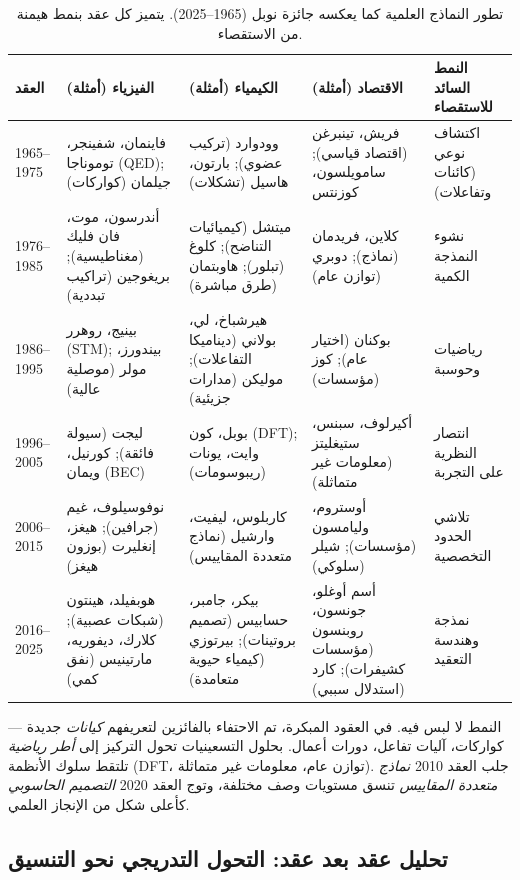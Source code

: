\documentclass[12pt,a4paper]{article}
\begin{document}
	\begin{table}[htbp]
		\centering
		\caption{تطور النماذج العلمية كما يعكسه جائزة نوبل (1965--2025). يتميز كل عقد بنمط هيمنة من الاستقصاء.}
		\label{tab:nobel}
		\small
		\begin{tabular}{p{2.5cm}p{3.5cm}p{3.5cm}p{2.5cm}p{2.8cm}}
			\toprule
			\textbf{العقد} & \textbf{الفيزياء (أمثلة)} & \textbf{الكيمياء (أمثلة)} & \textbf{الاقتصاد (أمثلة)} & \textbf{النمط السائد للاستقصاء} \\
			\midrule
			1965--1975 & فاينمان، شفينجر، توموناجا (QED); جيلمان (كواركات) & وودوارد (تركيب عضوي); بارتون، هاسيل (تشكلات) & فريش، تينبرغن (اقتصاد قياسي); سامويلسون، كوزنتس & اكتشاف نوعي (كائنات وتفاعلات) \\
			1976--1985 & أندرسون، موت، فان فليك (مغناطيسية); بريغوجين (تراكيب تبددية) & ميتشل (كيميائيات التناضح); كلوغ (تبلور); هاوبتمان (طرق مباشرة) & كلاين، فريدمان (نماذج); دوبري (توازن عام) & نشوء النمذجة الكمية \\
			1986--1995 & بينيج، روهرر (STM); بيندورز، مولر (موصلية عالية) & هيرشباخ، لي، بولاني (ديناميكا التفاعلات); موليكن (مدارات جزيئية) & بوكنان (اختيار عام); كوز (مؤسسات) & رياضيات وحوسبة \\
			1996--2005 & ليجت (سيولة فائقة); كورنيل، ويمان (BEC) & بوبل، كون (DFT); وايت، يونات (ريبوسومات) & أكيرلوف، سبنس، ستيغليتز (معلومات غير متماثلة) & انتصار النظرية على التجربة \\
			2006--2015 & نوفوسيلوف، غيم (جرافين); هيغز، إنغليرت (بوزون هيغز) & كاربلوس، ليفيت، وارشيل (نماذج متعددة المقاييس) & أوستروم، وليامسون (مؤسسات); شيلر (سلوكي) & تلاشي الحدود التخصصية \\
			2016--2025 & هوبفيلد، هينتون (شبكات عصبية); كلارك، ديفوريه، مارتينيس (نفق كمي) & بيكر، جامبر، حسابيس (تصميم بروتينات); بيرتوزي (كيمياء حيوية متعامدة) & أسم أوغلو، جونسون، روبنسون (مؤسسات كشيفرات); كارد (استدلال سببي) & نمذجة وهندسة التعقيد \\
			\bottomrule
		\end{tabular}
	\end{table}
	
	النمط لا لبس فيه. في العقود المبكرة، تم الاحتفاء بالفائزين لتعريفهم \emph{كيانات} جديدة — كواركات، آليات تفاعل، دورات أعمال. بحلول التسعينيات تحول التركيز إلى \emph{أطر رياضية} تلتقط سلوك الأنظمة (DFT، توازن عام، معلومات غير متماثلة). جلب العقد 2010 \emph{نماذج متعددة المقاييس} تنسق مستويات وصف مختلفة، وتوج العقد 2020 \emph{التصميم الحاسوبي} كأعلى شكل من الإنجاز العلمي.
	
	\subsection{تحليل عقد بعد عقد: التحول التدريجي نحو التنسيق}
	
\end{document}
